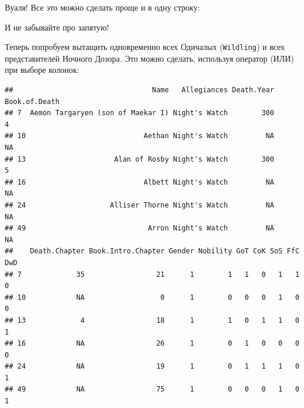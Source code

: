 \documentclass[]{book}
\newenvironment{Shaded}{\begin{snugshade}}{\end{snugshade}}
\newcommand{\KeywordTok}[1]{\textcolor[rgb]{0.13,0.29,0.53}{\textbf{#1}}}
\newcommand{\StringTok}[1]{\textcolor[rgb]{0.31,0.60,0.02}{#1}}
\newcommand{\OperatorTok}[1]{\textcolor[rgb]{0.81,0.36,0.00}{\textbf{#1}}}
\newcommand{\NormalTok}[1]{#1}
\begin{document}
Вуаля! Все это можно сделать проще и в одну строку:

\begin{Shaded}
\end{Shaded}

И не забывайте про запятую!

Теперь попробуем вытащить одновременно всех Одичалых (\texttt{Wildling})
и всех представителей Ночного Дозора. Это можно сделать, используя
оператор \texttt{\textbar{}} (ИЛИ) при выборе колонок:

\begin{Shaded}
\end{Shaded}

\begin{verbatim}
##                                 Name   Allegiances Death.Year Book.of.Death
## 7  Aemon Targaryen (son of Maekar I) Night's Watch        300             4
## 10                            Aethan Night's Watch         NA            NA
## 13                     Alan of Rosby Night's Watch        300             5
## 16                            Albett Night's Watch         NA            NA
## 24                    Alliser Thorne Night's Watch         NA            NA
## 49                             Arron Night's Watch         NA            NA
##    Death.Chapter Book.Intro.Chapter Gender Nobility GoT CoK SoS FfC DwD
## 7             35                 21      1        1   1   0   1   1   0
## 10            NA                  0      1        0   0   0   1   0   0
## 13             4                 18      1        1   0   1   1   0   1
## 16            NA                 26      1        0   1   0   0   0   0
## 24            NA                 19      1        0   1   1   1   0   1
## 49            NA                 75      1        0   0   0   1   0   1
\end{verbatim}
\end{document}
